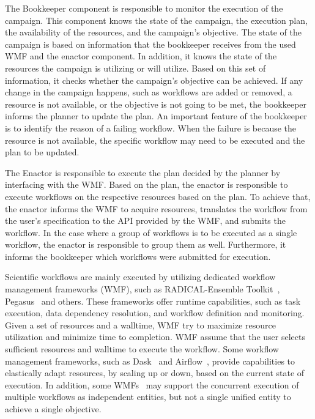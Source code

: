 The Bookkeeper component is responsible to monitor the execution of the campaign.
This component knows the state of the campaign, the execution plan, the availability of the resources, and the campaign's objective.
The state of the campaign is based on information that the bookkeeper receives from the used WMF and the enactor component.
In addition, it knows the state of the resources the campaign is utilizing or will utilize.
Based on this set of information, it checks whether the campaign's objective can be achieved.
If any change in the campaign happens, such as workflows are added or removed, a resource is not available, or the objective is not going to be met, the bookkeeper informs the planner to update the plan.
An important feature of the bookkeeper is to identify the reason of a failing workflow.
When the failure is because the resource is not available, the specific workflow may need to be executed and the plan to be updated.

The Enactor is responsible to execute the plan decided by the planner by interfacing with the WMF.
Based on the plan, the enactor is responsible to execute workflows on the respective resources based on the plan.
To achieve that, the enactor informs the WMF to acquire resources, translates the workflow from the user's specification to the API provided by the WMF, and submits the workflow.
In the case where a group of workflows is to be executed as a single workflow, the enactor is responsible to group them as well.
Furthermore, it informs the bookkeeper which workflows were submitted for execution.



Scientific workflows are mainly executed by utilizing dedicated workflow management frameworks (WMF), such as RADICAL-Ensemble Toolkit~\cite{balasubramanian2018harnessing}, Pegasus~\cite{deelman2015pegasus} and others.
These frameworks offer runtime capabilities, such as task execution, data dependency resolution, and workflow definition and monitoring.
Given a set of resources and a walltime, WMF try to maximize resource utilization and minimize time to completion.
WMF assume that the user selects sufficient resources and walltime to execute the workflow.
Some workflow management frameworks, such as Dask~\cite{rocklin2015dask} and Airflow~\cite{airflow}, provide capabilities to elastically adapt resources, by scaling up or down, based on the current state of execution.
In addition, some  WMFs~\cite{deelman2015pegasus} may support the concurrent execution of multiple workflows as independent entities, but not a single unified entity to achieve a single objective.

